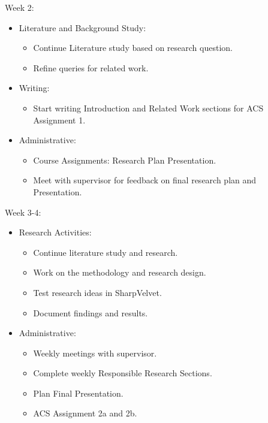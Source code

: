 \documentclass[english, a4paper]{article}
\begin{document}
Week 2:
\begin{itemize}
    \item Literature and Background Study:
    \begin{itemize}
        \item Continue Literature study based on research question.
        \item Refine queries for related work.
    \end{itemize}

    \item Writing:
    \begin{itemize}
        \item Start writing Introduction and Related Work sections for ACS Assignment 1.
    \end{itemize}

    \item Administrative:
    \begin{itemize}
        \item Course Assignments: Research Plan Presentation.
        \item Meet with supervisor for feedback on final research plan and Presentation.
    \end{itemize}
\end{itemize}

Week 3-4:
\begin{itemize}
    \item Research Activities:
    \begin{itemize}
        \item Continue literature study and research.
        \item Work on the methodology and research design.
        \item Test research ideas in SharpVelvet.
        \item Document findings and results.
    \end{itemize}
    
    \item Administrative:
    \begin{itemize}
        \item Weekly meetings with supervisor.
        \item Complete weekly Responsible Research Sections.
        \item Plan Final Presentation.
        \item ACS Assignment 2a and 2b.
    \end{itemize}
\end{itemize}
\end{document}
